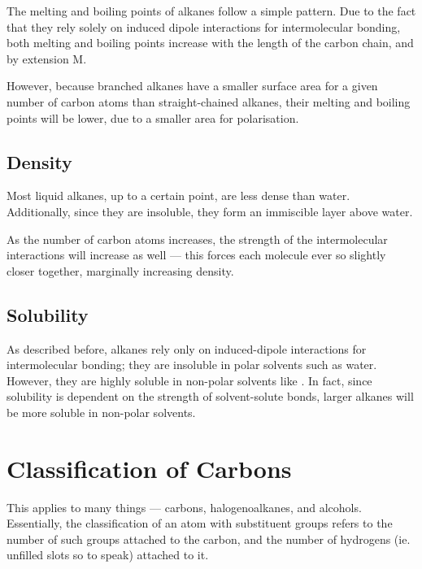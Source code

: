 			The melting and boiling points of alkanes follow a simple pattern. Due to the fact that they rely solely on induced
			dipole interactions for intermolecular bonding, both melting and boiling points increase with the length of the
			carbon chain, and by extension M.

			However, because branched alkanes have a smaller surface area for a given number of carbon atoms than straight-chained
			alkanes, their melting and boiling points will be lower, due to a smaller area for polarisation.


		\subsection{Density}

			Most liquid alkanes, up to a certain point, are less dense than water. Additionally, since they are insoluble,
			they form an immiscible layer above water.

			As the number of carbon atoms increases, the strength of the intermolecular interactions will increase as well --- this
			forces each molecule ever so slightly closer together, marginally increasing density.


		\subsection{Solubility}

			As described before, alkanes rely only on induced-dipole interactions for intermolecular bonding; they are insoluble in
			polar solvents such as water. However, they are highly soluble in non-polar solvents like . In fact,
			since solubility is dependent on the strength of solvent-solute bonds, larger alkanes will be more soluble in non-polar solvents.




	\section{Classification of Carbons}

		This applies to many things --- carbons, halogenoalkanes, and alcohols. Essentially, the classification of an atom with
		substituent groups refers to the number of such groups attached to the carbon, and the number of hydrogens (ie. unfilled
		slots so to speak) attached to it.

